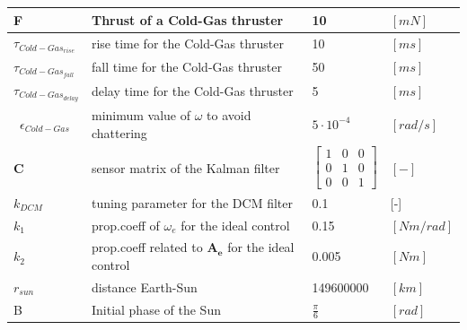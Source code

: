 \documentclass[11pt]{article}
\begin{document}
\begin{table}[H]
\begin{tabular}{|M{2cm}|M{5cm}|M{6cm}|M{2cm}|}
\hline
F & Thrust of a Cold-Gas thruster & 10 & $[mN]$\\
\hline
$\tau_{Cold-Gas_{rise}}$&rise time for the Cold-Gas thruster & 10 & $[ms]$\\
\hline
$\tau_{Cold-Gas_{fall}}$&fall time for the Cold-Gas thruster & 50 & $[ms]$ \\
\hline
$\tau_{Cold-Gas_{delay}}$&delay time for the Cold-Gas thruster & 5 & $[ms]$\\
\hline
\
$\epsilon_{Cold-Gas}$&minimum value of $\omega$ to avoid chattering & $5 \cdot 10^{-4}$& $[rad/s]$\\
\hline
$\mathbf{C}$ & sensor matrix of the Kalman filter & $$\begin{bmatrix}
1&0&0\\
0&1&0\\
0&0&1
\end{bmatrix}$$& $[-]$\\
\hline
$k_{DCM}$& tuning parameter for the DCM filter & 0.1& [-]\\
\hline
$k_1$& prop.coeff of $\omega_e$ for the ideal control & 0.15 & $[Nm/rad]$\\
\hline
$k_2$& prop.coeff related to $\mathbf{A_e}$ for the ideal control & 0.005 & $[Nm]$\\
\hline
$r_{sun}$& distance Earth-Sun & 149600000 & $[km]$\\
\hline
B& Initial phase of the Sun & $\frac{\pi}{6}$ & $[rad]$\\
\hline
\end{tabular}
\end{table}







\clearpage
\end{document}
